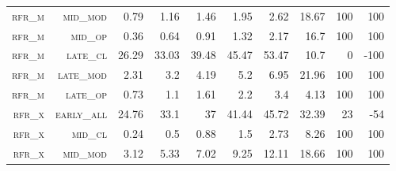 \begin{landscape}
\begin{table}[!htbp]
\begin{tabular}{@{}rrrrrrr|rrr@{}}
\footnotesize \textsc{rfr\_m}      & \footnotesize \textsc{mid\_mod  }        & \footnotesize  0.79        & \footnotesize 1.16    & \footnotesize 1.46      & \footnotesize 1.95             & \footnotesize 2.62      & \footnotesize 18.67    & \footnotesize 100   & \footnotesize 100      \\
\footnotesize \textsc{rfr\_m}      & \footnotesize \textsc{mid\_op   }        & \footnotesize  0.36        & \footnotesize 0.64    & \footnotesize 0.91      & \footnotesize 1.32             & \footnotesize 2.17      & \footnotesize 16.7     & \footnotesize 100   & \footnotesize 100      \\
\footnotesize \textsc{rfr\_m}      & \footnotesize \textsc{late\_cl  }         & \footnotesize 26.29       & \footnotesize 33.03   & \footnotesize 39.48     & \footnotesize 45.47            & \footnotesize 53.47     & \footnotesize 10.7     & \footnotesize 0     & \footnotesize -100      \\
\footnotesize \textsc{rfr\_m}      & \footnotesize \textsc{late\_mod }        & \footnotesize  2.31        & \footnotesize 3.2     & \footnotesize 4.19      & \footnotesize 5.2              & \footnotesize 6.95      & \footnotesize 21.96    & \footnotesize 100   & \footnotesize 100      \\
\footnotesize \textsc{rfr\_m}      & \footnotesize \textsc{late\_op  }        & \footnotesize  0.73        & \footnotesize 1.1     & \footnotesize 1.61      & \footnotesize 2.2              & \footnotesize 3.4       & \footnotesize 4.13     & \footnotesize 100   & \footnotesize 100     \\
\footnotesize \textsc{rfr\_x}      & \footnotesize \textsc{early\_all}         & \footnotesize 24.76       & \footnotesize 33.1    & \footnotesize 37        & \footnotesize 41.44            & \footnotesize 45.72     & \footnotesize 32.39    & \footnotesize 23    & \footnotesize -54      \\
\footnotesize \textsc{rfr\_x}      & \footnotesize \textsc{mid\_cl   }        & \footnotesize  0.24        & \footnotesize 0.5     & \footnotesize 0.88      & \footnotesize 1.5              & \footnotesize 2.73      & \footnotesize 8.26     & \footnotesize 100   & \footnotesize 100      \\
\footnotesize \textsc{rfr\_x}      & \footnotesize \textsc{mid\_mod  }        & \footnotesize  3.12        & \footnotesize 5.33    & \footnotesize 7.02      & \footnotesize 9.25             & \footnotesize 12.11     & \footnotesize 18.66    & \footnotesize 100   & \footnotesize 100      \\

\end{tabular}
\end{table}
\end{landscape}

